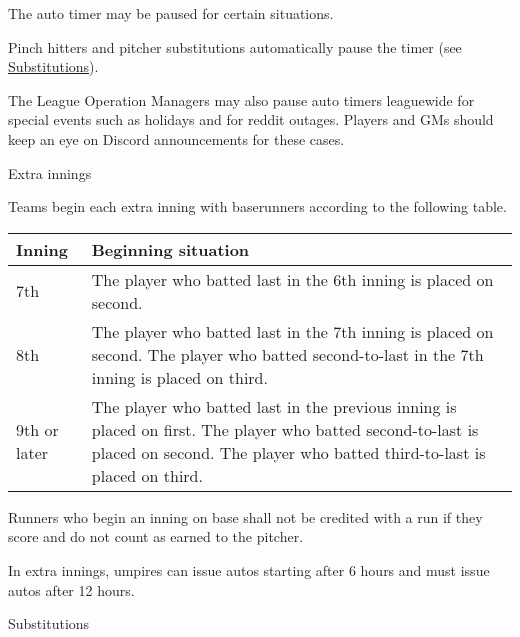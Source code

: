 \begin{deepEnumerate}
\begin{deepEnumerate}
		\item The auto timer may be paused for certain situations.
		\begin{deepEnumerate}
			\item Pinch hitters and pitcher substitutions automatically pause the timer (see \hyperref[sec:substitutions]{Substitutions}).
			\item The League Operation Managers may also pause auto timers leaguewide for special events such as holidays and for reddit outages.
			Players and GMs should keep an eye on Discord announcements for these cases.
		\end{deepEnumerate}
	\end{deepEnumerate}
	\item Extra innings
	\label{sec:extra innings}
	\begin{deepEnumerate}
		\item Teams begin each extra inning with baserunners according to the following table.
		\begin{center}										                
			\begin{longtable}{|p{3cm}|p{8cm}|}
				\hline
				\textbf{Inning} & \textbf{Beginning situation}                                          \\
				\hline
				7th             & The player who batted last in the 6th inning is placed on second.     \\
				\hline
				8th             & The player who batted last in the 7th inning is placed on second.     
				The player who batted second-to-last in the 7th inning is placed on third. \\
				\hline
				9th or later    & The player who batted last in the previous inning is placed on first. 
				The player who batted second-to-last is placed on second.
				The player who batted third-to-last is placed on third. \\
				\hline
			\end{longtable}
		\end{center}
		\item Runners who begin an inning on base shall not be credited with a run if they score and
		do not count as earned to the pitcher.
		\item In extra innings, umpires can issue autos starting after 6 hours and must issue autos after 12 hours.
	\end{deepEnumerate}
	\item Substitutions
	\label{sec:substitutions}
	\begin{deepEnumerate}

\end{deepEnumerate}
\end{deepEnumerate}
